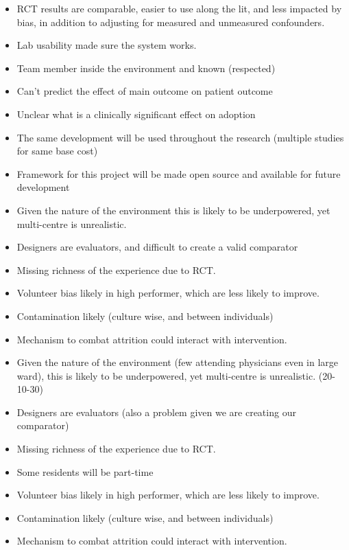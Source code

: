 \begin{itemize}
    \item RCT results are comparable, easier to use along the lit, and less impacted by bias, in addition to adjusting for measured and unmeasured confounders.
    \item Lab usability made sure the system works.
    \item Team member inside the environment and known (respected)
    \item Can’t predict the effect of main outcome on patient outcome
    \item Unclear what is a clinically significant effect on adoption
    \item The same development will be used throughout the research (multiple studies for same base cost)
    \item Framework for this project will be made open source and available for future development
    \item Given the nature of the environment this is likely to be underpowered, yet multi-centre is unrealistic.
    \item Designers are evaluators, and difficult to create a valid comparator
    \item Missing richness of the experience due to RCT.
    \item Volunteer  bias likely in high performer, which are less likely to improve.
    \item Contamination likely (culture wise, and between individuals)
    \item Mechanism to combat attrition could interact with intervention.
\end{itemize}

\begin{itemize}
    \item Given the nature of the environment (few attending physicians even in large ward), this is likely to be underpowered, yet multi-centre is unrealistic. (20-10-30)
    \item Designers are evaluators (also a problem given we are creating our comparator)
    \item Missing richness of the experience due to RCT.
    \item Some residents will be part-time
    \item Volunteer bias likely in high performer, which are less likely to improve.
    \item Contamination likely (culture wise, and between individuals)
    \item Mechanism to combat attrition could interact with intervention.
\end{itemize}